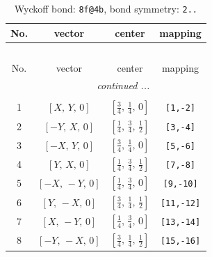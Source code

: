 \documentclass[fleqn,8pt]{jsarticle}
\begin{document}
\begin{longtable}{cccc}
\caption{Wyckoff bond: {\tt 8f@4b}, bond symmetry: {\tt 2..}}
 \\
 \hline \hline
No. & vector & center & mapping \\ \hline \endfirsthead

\multicolumn{3}{l}{\tablename\ \thetable{}} \\
 \hline \hline
No. & vector & center & mapping \\ \hline \endhead

 \hline \hline
\multicolumn{3}{r}{\footnotesize\it continued ...} \\ \endfoot

 \hline \hline
\multicolumn{3}{r}{} \\ \endlastfoot

1 & $\left[ X,\, Y,\, 0 \right]$ & $\left[ \frac{3}{4},\, \frac{1}{4},\, 0 \right]$ & {\tt [1,-2]} \\ \hline
2 & $\left[ - Y,\, X,\, 0 \right]$ & $\left[ \frac{1}{4},\, \frac{3}{4},\, \frac{1}{2} \right]$ & {\tt [3,-4]} \\ \hline
3 & $\left[ - X,\, Y,\, 0 \right]$ & $\left[ \frac{3}{4},\, \frac{1}{4},\, 0 \right]$ & {\tt [5,-6]} \\ \hline
4 & $\left[ Y,\, X,\, 0 \right]$ & $\left[ \frac{1}{4},\, \frac{3}{4},\, \frac{1}{2} \right]$ & {\tt [7,-8]} \\ \hline
5 & $\left[ - X,\, - Y,\, 0 \right]$ & $\left[ \frac{1}{4},\, \frac{3}{4},\, 0 \right]$ & {\tt [9,-10]} \\ \hline
6 & $\left[ Y,\, - X,\, 0 \right]$ & $\left[ \frac{3}{4},\, \frac{1}{4},\, \frac{1}{2} \right]$ & {\tt [11,-12]} \\ \hline
7 & $\left[ X,\, - Y,\, 0 \right]$ & $\left[ \frac{1}{4},\, \frac{3}{4},\, 0 \right]$ & {\tt [13,-14]} \\ \hline
8 & $\left[ - Y,\, - X,\, 0 \right]$ & $\left[ \frac{3}{4},\, \frac{1}{4},\, \frac{1}{2} \right]$ & {\tt [15,-16]} \\
\end{longtable}
\renewcommand{\arraystretch}{1.2}
\end{document}
